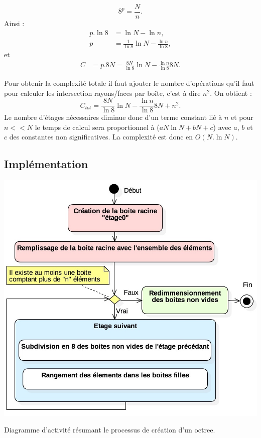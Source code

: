 \begin{equation} 
8^p = \frac{N}{n}.
\end{equation}
%
Ainsi :
\begin{align}
p.\ln{8} &= \ln{N} -  \ln{n}, \nonumber \\
p &= \frac{1}{\ln{8}}\ln{N} -  \frac{\ln{n}}{\ln{8}}, 
\end{align}
et
\begin{align}
C &=  p.8N = \frac{8N}{\ln8}\ln{N} - \frac{\ln n }{\ln8}8N.
\end{align}

Pour obtenir la complexité totale il faut ajouter le nombre d'opérations qu'il faut pour calculer les intersection rayons/faces par boîte, c'est à dire $n^2$. On obtient :
\begin{equation}
C_{tot} = \frac{8N}{\ln8}\ln{N} - \frac{\ln n }{\ln8}8N + n^2.
\end{equation}
Le nombre d'étages nécessaires diminue donc d'un terme constant lié à $n$ et pour $n << N$ le temps de calcul sera proportionnel à ($aN\ln{N} + bN + c$) avec $a$, $b$ et $c$ des constantes non significatives. La complexité est donc en $O(N.\ln{N})$.



\subsection{Implémentation}


\begin{figureth}
	\includegraphics[width=0.7\linewidth]{images/DiagOctree}
	\caption{Diagramme d'activité résumant le processus de création d'un \gls{octree}.}
	\label{DiagOctree}
\end{figureth}

